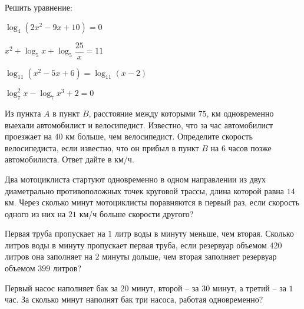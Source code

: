\begin{listofex}
	\item Решить уравнение:
	\begin{enumcols}[itemcolumns=2]
		\item \( \log_4(2x^2-9x+10)=0 \)
		\item \( x^2+\log_5 x + \log_5\dfrac{25}{x}=11 \)
		\item \( \log_{11}(x^2-5x+6)=\log_{11}(x-2) \)
		\item \( \log^2_7 x - \log_7 x^3 + 2 = 0 \)
	\end{enumcols}
	\item Из пункта \( A \) в пункт \( B \), расстояние между которыми \(75\), км одновременно выехали автомобилист и велосипедист. Известно, что за час автомобилист проезжает на \(40\) км больше, чем велосипедист. Определите скорость велосипедиста, если известно, что он прибыл в пункт \(B\) на \(6\) часов позже автомобилиста. Ответ дайте в км/ч.
	\item Два мотоциклиста стартуют одновременно в одном направлении из двух диаметрально противоположных точек круговой трассы, длина которой равна \( 14  \) км. Через сколько минут мотоциклисты поравняются в первый раз, если скорость одного из них на \( 21  \) км/ч больше скорости другого?
	\item Первая труба пропускает на \(1\) литр воды в минуту меньше, чем вторая. Сколько литров воды в минуту пропускает первая труба, если резервуар объемом \(420\) литров она заполняет на \( 2 \) минуты дольше, чем вторая заполняет резервуар объемом \(399\) литров?
	\item Первый насос наполняет бак за \( 20 \) минут, второй – за \( 30 \) минут, а третий – за \( 1 \) час. За сколько минут наполнят бак три насоса, работая одновременно?
\end{listofex}